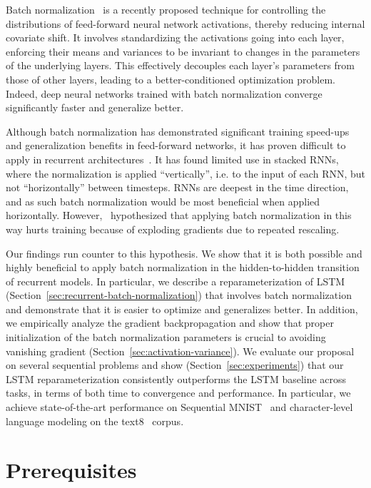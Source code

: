 \documentclass{article} %
\begin{document}
Batch normalization~\citep{batchnorm} is a recently proposed technique for controlling the distributions of feed-forward neural network activations, thereby reducing internal covariate shift.
It involves standardizing the activations going into each layer, enforcing their means and variances to be invariant to changes in the parameters of the underlying layers.
This effectively decouples each layer's parameters from those of other layers, leading to a better-conditioned optimization problem.
Indeed, deep neural networks trained with batch normalization converge significantly faster and generalize better.

Although batch normalization has demonstrated significant training speed-ups and generalization benefits in feed-forward networks,
it has proven difficult to apply in recurrent architectures~\citep{cesar,baidu}.
It has found limited use in stacked RNNs, where the normalization is applied ``vertically'',
i.e. to the input of each RNN, but not ``horizontally'' between timesteps.
RNNs are deepest in the time direction, and as such batch normalization would be most beneficial when applied horizontally.
However,~\citet{cesar} hypothesized that applying batch normalization in this way hurts training
because of exploding gradients due to repeated rescaling.

Our findings run counter to this hypothesis.
We show that it is both possible and highly beneficial to apply batch normalization in the hidden-to-hidden transition of recurrent models.
In particular, we describe a reparameterization of LSTM (Section~\ref{sec:recurrent-batch-normalization}) that involves batch normalization
and demonstrate that it is easier to optimize and generalizes better.
In addition, we empirically analyze the gradient backpropagation and show that proper initialization
of the batch normalization parameters is crucial to avoiding vanishing gradient (Section~\ref{sec:activation-variance}).
We evaluate our proposal on several sequential problems and show (Section~\ref{sec:experiments}) that our
LSTM reparameterization consistently outperforms the LSTM baseline across tasks,
in terms of both time to convergence and performance.
In particular, we achieve state-of-the-art performance on
Sequential MNIST~\citep{le2015simple} and
character-level language modeling on the text8~\citep{mahoney2009large} corpus.

\section{Prerequisites}
\label{sec:prerequisites}
\end{document}
